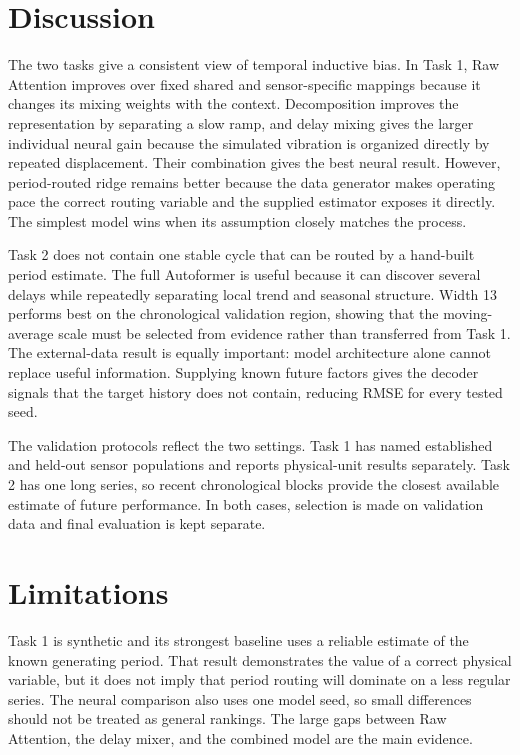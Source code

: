 \documentclass{article}
\begin{document}
\section{Discussion}
\label{sec:discussion}

The two tasks give a consistent view of temporal inductive bias. In Task 1, Raw Attention improves over fixed shared and sensor-specific mappings because it changes its mixing weights with the context. Decomposition improves the representation by separating a slow ramp, and delay mixing gives the larger individual neural gain because the simulated vibration is organized directly by repeated displacement. Their combination gives the best neural result. However, period-routed ridge remains better because the data generator makes operating pace the correct routing variable and the supplied estimator exposes it directly. The simplest model wins when its assumption closely matches the process.

Task 2 does not contain one stable cycle that can be routed by a hand-built period estimate. The full Autoformer is useful because it can discover several delays while repeatedly separating local trend and seasonal structure. Width 13 performs best on the chronological validation region, showing that the moving-average scale must be selected from evidence rather than transferred from Task 1. The external-data result is equally important: model architecture alone cannot replace useful information. Supplying known future factors gives the decoder signals that the target history does not contain, reducing RMSE for every tested seed.

The validation protocols reflect the two settings. Task 1 has named established and held-out sensor populations and reports physical-unit results separately. Task 2 has one long series, so recent chronological blocks provide the closest available estimate of future performance. In both cases, selection is made on validation data and final evaluation is kept separate.

\section{Limitations}
\label{sec:limitations}

Task 1 is synthetic and its strongest baseline uses a reliable estimate of the known generating period. That result demonstrates the value of a correct physical variable, but it does not imply that period routing will dominate on a less regular series. The neural comparison also uses one model seed, so small differences should not be treated as general rankings. The large gaps between Raw Attention, the delay mixer, and the combined model are the main evidence.
\end{document}
